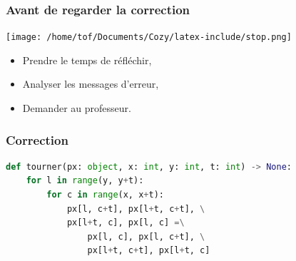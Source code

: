 \documentclass[svgnames,11pt]{beamer}
\begin{document}
\begin{frame}
    \frametitle{Avant de regarder la correction}
\begin{center}
    \centering
    \texttt{[image: /home/tof/Documents/Cozy/latex-include/stop.png]}
    \end{center}
{\Large
    \begin{itemize}
        \item Prendre le temps de réfléchir,
        \item Analyser les messages d'erreur,
        \item Demander au professeur.
    \end{itemize}
}
\end{frame}
\begin{frame}[fragile]
    \frametitle{Correction}

   \begin{center}
   \begin{lstlisting}[language=Python , basicstyle=\ttfamily\small, xleftmargin=0em, xrightmargin=0em]
def tourner(px: object, x: int, y: int, t: int) -> None:
    for l in range(y, y+t):
        for c in range(x, x+t):
            px[l, c+t], px[l+t, c+t], \
            px[l+t, c], px[l, c] =\
                px[l, c], px[l, c+t], \
                px[l+t, c+t], px[l+t, c]
\end{lstlisting}
   \label{CODE}
   \end{center} 

\end{frame}
\end{document}
